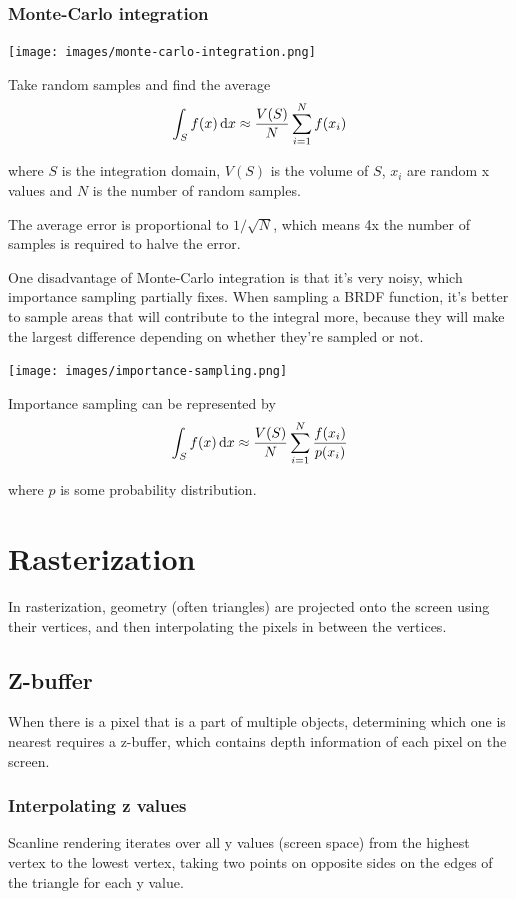 \documentclass[12pt]{article}
\begin{document}
\subsubsection{Monte-Carlo integration}

\texttt{[image: images/monte-carlo-integration.png]}

Take random samples and find the average
\[ \int_S f(x) \mathop{}\!\mathrm{d} x \approx \frac{V(S)}{N} \sum_{i=1}^N f(x_i) \]

where $S$ is the integration domain, $V(S)$ is the volume of $S$, $x_i$
are random x values and $N$ is the number of random samples.

The average error is proportional to $1/\sqrt{N}$, which means 4x the number
of samples is required to halve the error.

One disadvantage of Monte-Carlo integration is that it's very noisy, which
importance sampling partially fixes. When sampling a BRDF function, it's better
to sample areas that will contribute to the integral more, because they will
make the largest difference depending on whether they're sampled or not.

\texttt{[image: images/importance-sampling.png]}

Importance sampling can be represented by
\[ \int_S f(x) \mathop{}\!\mathrm{d} x \approx \frac{V(S)}{N} \sum_{i=1}^N \frac{f(x_i)}{p(x_i)} \]

where $p$ is some probability distribution.

\section{Rasterization}

In rasterization, geometry (often triangles) are projected onto the screen using their vertices,
and then interpolating the pixels in between the vertices.

\subsection{Z-buffer}

When there is a pixel that is a part of multiple objects, determining which one is nearest requires
a z-buffer, which contains depth information of each pixel on the screen.

\subsubsection{Interpolating z values}

Scanline rendering iterates over all y values (screen space) from the highest vertex to
the lowest vertex, taking two points on opposite sides on the edges of the triangle for
each y value.
\end{document}
